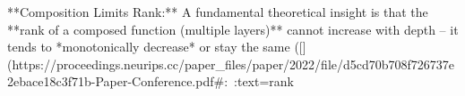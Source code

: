 **Composition Limits Rank:** A fundamental theoretical insight is that the **rank of a composed function (multiple layers)** cannot increase with depth – it tends to *monotonically decrease* or stay the same ([](https://proceedings.neurips.cc/paper_files/paper/2022/file/d5cd70b708f726737e2ebace18c3f71b-Paper-Conference.pdf#:~:text=rank%

